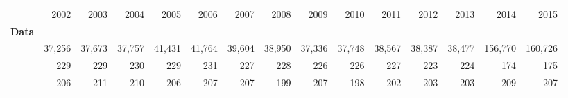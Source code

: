 \begin{tabular}{lllllllllllllll}
\cline{1-15}
\multicolumn{1}{c}{} &
  \multicolumn{1}{|r}{2002} &
  \multicolumn{1}{r}{2003} &
  \multicolumn{1}{r}{2004} &
  \multicolumn{1}{r}{2005} &
  \multicolumn{1}{r}{2006} &
  \multicolumn{1}{r}{2007} &
  \multicolumn{1}{r}{2008} &
  \multicolumn{1}{r}{2009} &
  \multicolumn{1}{r}{2010} &
  \multicolumn{1}{r}{2011} &
  \multicolumn{1}{r}{2012} &
  \multicolumn{1}{r}{2013} &
  \multicolumn{1}{r}{2014} &
  \multicolumn{1}{r}{2015} \\
\cline{1-15}
\multicolumn{1}{l}{\textbf{Data}} &
  \multicolumn{1}{|r}{} &
  \multicolumn{1}{r}{} &
  \multicolumn{1}{r}{} &
  \multicolumn{1}{r}{} &
  \multicolumn{1}{r}{} &
  \multicolumn{1}{r}{} &
  \multicolumn{1}{r}{} &
  \multicolumn{1}{r}{} &
  \multicolumn{1}{r}{} &
  \multicolumn{1}{r}{} &
  \multicolumn{1}{r}{} &
  \multicolumn{1}{r}{} &
  \multicolumn{1}{r}{} &
  \multicolumn{1}{r}{} \\
\multicolumn{1}{l}{\hspace{1em}{$\#$ obs.}} &
  \multicolumn{1}{|r}{37,256} &
  \multicolumn{1}{r}{37,673} &
  \multicolumn{1}{r}{37,757} &
  \multicolumn{1}{r}{41,431} &
  \multicolumn{1}{r}{41,764} &
  \multicolumn{1}{r}{39,604} &
  \multicolumn{1}{r}{38,950} &
  \multicolumn{1}{r}{37,336} &
  \multicolumn{1}{r}{37,748} &
  \multicolumn{1}{r}{38,567} &
  \multicolumn{1}{r}{38,387} &
  \multicolumn{1}{r}{38,477} &
  \multicolumn{1}{r}{156,770} &
  \multicolumn{1}{r}{160,726} \\
\multicolumn{1}{l}{\hspace{1em}{$\#$ sectors}} &
  \multicolumn{1}{|r}{229} &
  \multicolumn{1}{r}{229} &
  \multicolumn{1}{r}{230} &
  \multicolumn{1}{r}{229} &
  \multicolumn{1}{r}{231} &
  \multicolumn{1}{r}{227} &
  \multicolumn{1}{r}{228} &
  \multicolumn{1}{r}{226} &
  \multicolumn{1}{r}{226} &
  \multicolumn{1}{r}{227} &
  \multicolumn{1}{r}{223} &
  \multicolumn{1}{r}{224} &
  \multicolumn{1}{r}{174} &
  \multicolumn{1}{r}{175} \\
\multicolumn{1}{l}{\hspace{1em}{$\#$ origin countries}} &
  \multicolumn{1}{|r}{206} &
  \multicolumn{1}{r}{211} &
  \multicolumn{1}{r}{210} &
  \multicolumn{1}{r}{206} &
  \multicolumn{1}{r}{207} &
  \multicolumn{1}{r}{207} &
  \multicolumn{1}{r}{199} &
  \multicolumn{1}{r}{207} &
  \multicolumn{1}{r}{198} &
  \multicolumn{1}{r}{202} &
  \multicolumn{1}{r}{203} &
  \multicolumn{1}{r}{203} &
  \multicolumn{1}{r}{209} &
  \multicolumn{1}{r}{207} \\

\end{tabular}
